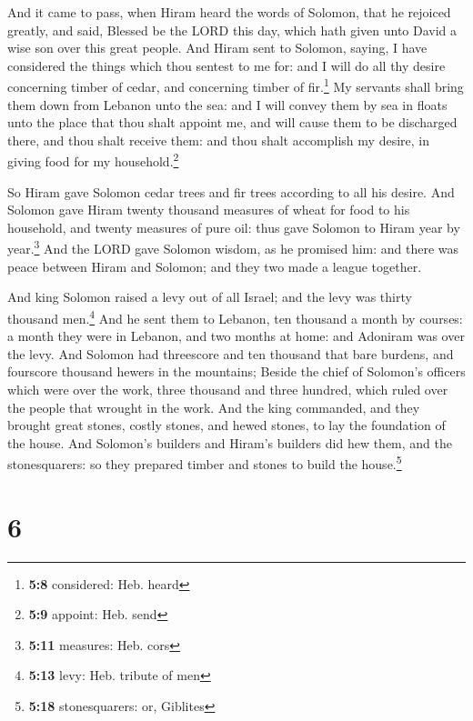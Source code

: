 And it came to pass, when Hiram heard the words of
Solomon, that he rejoiced greatly, and said, Blessed be the LORD this
day, which hath given unto David a wise son over this great people.
 And Hiram sent to Solomon, saying, I have considered the
things which thou sentest to me for: and I will do all thy desire
concerning timber of cedar, and concerning timber of fir.\footnote{\textbf{5:8}
  considered: Heb. heard}  My servants shall bring them
down from Lebanon unto the sea: and I will convey them by sea in floats
unto the place that thou shalt appoint me, and will cause them to be
discharged there, and thou shalt receive them: and thou shalt accomplish
my desire, in giving food for my household.\footnote{\textbf{5:9}
  appoint: Heb. send}

 So Hiram gave Solomon cedar trees and fir trees
according to all his desire.  And Solomon gave Hiram
twenty thousand measures of wheat for food to his household, and twenty
measures of pure oil: thus gave Solomon to Hiram year by
year.\footnote{\textbf{5:11} measures: Heb. cors}  And
the LORD gave Solomon wisdom, as he promised him: and there was peace
between Hiram and Solomon; and they two made a league together.

 And king Solomon raised a levy out of all Israel; and
the levy was thirty thousand men.\footnote{\textbf{5:13} levy: Heb.
  tribute of men}  And he sent them to Lebanon, ten
thousand a month by courses: a month they were in Lebanon, and two
months at home: and Adoniram was over the levy.  And
Solomon had threescore and ten thousand that bare burdens, and fourscore
thousand hewers in the mountains;  Beside the chief of
Solomon's officers which were over the work, three thousand and three
hundred, which ruled over the people that wrought in the work.
 And the king commanded, and they brought great stones,
costly stones, and hewed stones, to lay the foundation of the house.
 And Solomon's builders and Hiram's builders did hew
them, and the stonesquarers: so they prepared timber and stones to build
the house.\footnote{\textbf{5:18} stonesquarers: or, Giblites}

\hypertarget{section-5}{%
\section{6}\label{section-5}}

